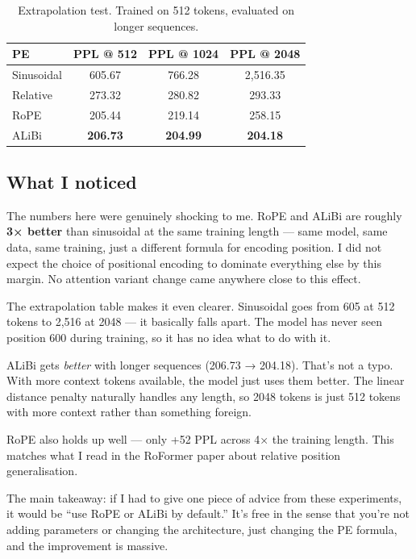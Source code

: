 \documentclass[12pt,a4paper]{article}
\begin{document}
\begin{table}[H]
\centering
\caption{Extrapolation test. Trained on 512 tokens, evaluated on longer sequences.}
\begin{tabular}{lccc}
\toprule
\textbf{PE} & \textbf{PPL @ 512} & \textbf{PPL @ 1024} & \textbf{PPL @ 2048} \\
\midrule
Sinusoidal & 605.67 & 766.28 & 2,516.35 \\
Relative   & 273.32 & 280.82 & 293.33 \\
RoPE       & 205.44 & 219.14 & 258.15 \\
ALiBi      & \textbf{206.73} & \textbf{204.99} & \textbf{204.18} \\
\bottomrule
\end{tabular}
\end{table}

\subsection{What I noticed}

The numbers here were genuinely shocking to me. RoPE and ALiBi are roughly \textbf{3× better} than sinusoidal at the same training length — same model, same data, same training, just a different formula for encoding position. I did not expect the choice of positional encoding to dominate everything else by this margin. No attention variant change came anywhere close to this effect.

The extrapolation table makes it even clearer. Sinusoidal goes from 605 at 512 tokens to 2,516 at 2048 — it basically falls apart. The model has never seen position 600 during training, so it has no idea what to do with it.

ALiBi gets \textit{better} with longer sequences (206.73 → 204.18). That's not a typo. With more context tokens available, the model just uses them better. The linear distance penalty naturally handles any length, so 2048 tokens is just 512 tokens with more context rather than something foreign.

RoPE also holds up well — only +52 PPL across 4× the training length. This matches what I read in the RoFormer paper about relative position generalisation.

The main takeaway: if I had to give one piece of advice from these experiments, it would be ``use RoPE or ALiBi by default.'' It's free in the sense that you're not adding parameters or changing the architecture, just changing the PE formula, and the improvement is massive.
\end{document}
